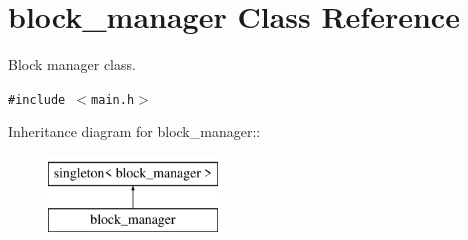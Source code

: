 \hypertarget{classblock__manager}{
\section{block\_\-manager Class Reference}
\label{classblock__manager}
}
Block manager class.  


{\tt \#include $<$main.h$>$}

Inheritance diagram for block\_\-manager::\begin{figure}[H]
\begin{center}
\leavevmode
\includegraphics[height=2cm]{classblock__manager}
\end{center}
\end{figure}
